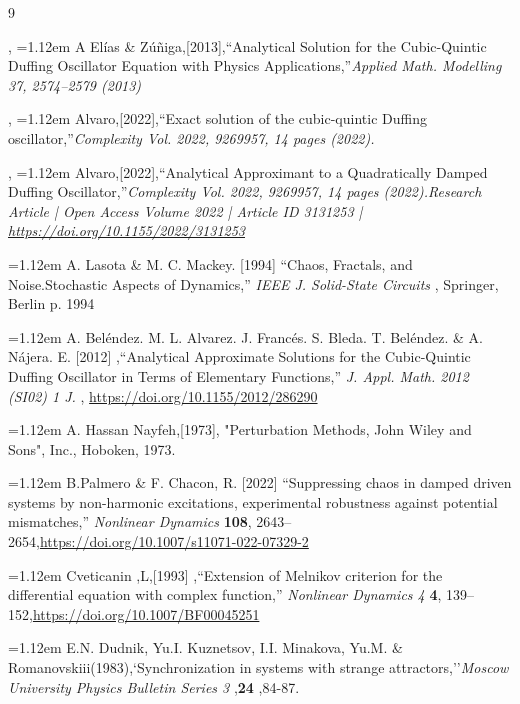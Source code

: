 \documentclass{ws-ijbc}
\begin{document}
\begin{thebibliography}{9}

,
\hangindent=1.12em A Elías \& Zúñiga,[2013],``Analytical Solution for the Cubic-Quintic Duffing Oscillator Equation with
Physics Applications,''{\it Applied Math. Modelling 37, 2574–2579 (2013)}

,
\hangindent=1.12em Alvaro,[2022],``Exact solution of the cubic-quintic Duffing oscillator,''{\it Complexity Vol. 2022, 9269957, 14 pages (2022).
}


,
\hangindent=1.12em Alvaro,[2022],``Analytical Approximant to a Quadratically Damped Duffing Oscillator,''{\it Complexity Vol. 2022, 9269957, 14 pages (2022).Research Article | Open Access
Volume 2022 | Article ID 3131253 | \url{https://doi.org/10.1155/2022/3131253}
}


\hangindent=1.12em A. Lasota 
 \&  M. C. Mackey. [1994] ``Chaos, Fractals, and Noise.Stochastic Aspects of Dynamics,'' {\it IEEE J. Solid-State
Circuits} , Springer, Berlin p. 1994

\hangindent=1.12em A. Beléndez. M. L. Alvarez. J. Francés. S. Bleda. T. Beléndez. \& A. Nájera. E. [2012] ,``Analytical Approximate Solutions for the Cubic-Quintic Duffing Oscillator in Terms of Elementary Functions,'' {\it J. Appl. Math. 2012 (SI02) 1 J.
} , \url{https://doi.org/10.1155/2012/286290}

\hangindent=1.12em A. Hassan Nayfeh,[1973], "Perturbation Methods, John Wiley and Sons", Inc., Hoboken, 1973.

\hangindent=1.12em B.Palmero \&  F. Chacon, R. [2022] ``Suppressing chaos in damped driven systems
by non-harmonic excitations, experimental robustness against potential
mismatches,'' {\it  Nonlinear Dynamics } {\bf 108},
2643–2654,\url{https://doi.org/10.1007/s11071-022-07329-2}

\hangindent=1.12em Cveticanin ,L,[1993] ,``Extension of Melnikov criterion for the differential equation with complex function,'' {\it  Nonlinear Dynamics 4 } {\bf 4},
139–152,\url{https://doi.org/10.1007/BF00045251}



\hangindent=1.12em E.N. Dudnik, Yu.I. Kuznetsov, I.I. Minakova, Yu.M.
\& Romanovskiii(1983),`Synchronization in systems with strange attractors,''{\it Moscow
University Physics Bulletin Series 3  } ,{\bf24} ,84-87.


\end{thebibliography}
\end{document}
